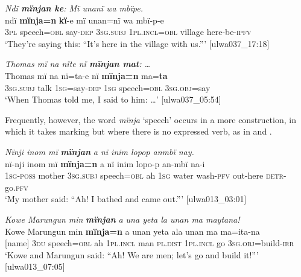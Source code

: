 \ea%
    \label{ex:syntax:226}
          \textit{Ndï \textbf{mïnjan ke}: Mï unanï wa mbïpe.}\\
\gll    ndï    \textbf{mïnja=n}    \textbf{kï}{}-e    mï      unan=nï    wa mbï-p-e\\
    3\textsc{pl}    speech=\textsc{obl}  say-\textsc{dep}  \textsc{3sg.subj}  \textsc{1pl.incl=obl}  village    here-be\textsc{{}-ipfv}\\
\glt `They’re saying this: “It’s here in the village with us.”’ [ulwa037\_17:18]
\z

\ea%
    \label{ex:syntax:227}
          \textit{Thomas mï na nïte nï \textbf{mïnjan mat}: …}\\
\gll    Thomas  mï      na    nï=ta-e      nï    \textbf{mïnja=n} ma=\textbf{ta}\\
    [name]    3\textsc{sg.subj}  talk  1\textsc{sg}=say-\textsc{dep}  \textsc{1sg}  speech=\textsc{obl}    3\textsc{sg.obj}=say\\
\glt `When Thomas told me, I said to him: …’ [ulwa037\_05:54]
\z

Frequently, however, the word \textit{mïnja} ‘speech’ occurs in a more  construction, in which it takes  marking but where there is no expressed verb, as in  and .


\newpage

\ea%
    \label{ex:syntax:228}
          \textit{Nïnji inom mï} \textbf{\textit{mïnjan}} \textit{a nï inim lopop anmbï nay.}\\
\gll    nï-nji    inom    mï      \textbf{mïnja=n}    a  nï    inim lopo-p    an-mbï    na-i\\
    1\textsc{sg-poss}  mother    \textsc{3sg.subj}  speech=\textsc{obl}  ah  1\textsc{sg}  water    wash-\textsc{pfv}  out-here  \textsc{detr-}go.\textsc{pfv}\\
\glt `My mother said: “Ah! I bathed and came out.”’ [ulwa013\_03:01]
\z

\ea%
    \label{ex:syntax:229}
          \textit{Kowe Marungun min} \textbf{\textit{mïnjan}} \textit{a una yeta la unan ma maytana!}\\
\gll    Kowe  Marungun  min  \textbf{mïnja=n}    a  unan    yeta ala      unan    ma  ma=ita-na\\
    [name]  [name]    \textsc{3du}  speech=\textsc{obl}  ah  1\textsc{pl.incl}  man    \textsc{pl.dist}  \textsc{1pl.incl}  go  3\textsc{sg.obj}=build-\textsc{irr}\\
\glt    ‘Kowe and Marungun said: “Ah! We are men; let’s go and build it!”’ [ulwa013\_07:05]
\z

